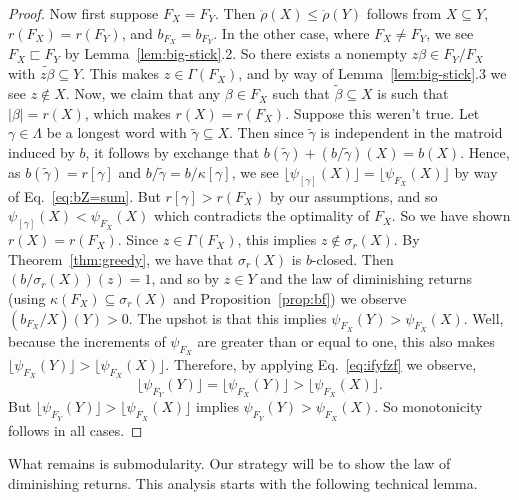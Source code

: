 \documentclass[11pt]{article}
\newcommand{\glang}{\Lambda}
\newcommand{\greedyrep}{\ddot{\rho}}
\begin{document}
\begin{proof}
    Now first suppose $F_X = F_Y$.
    Then $\greedyrep(X) \leq \greedyrep(Y)$ follows from $X\subseteq Y$, $r(F_X) = r(F_Y)$, and $b_{F_X} = b_{F_Y}$.
    In the other case, where $F_X \neq F_Y$, we see $F_X \sqsubset F_Y$ by Lemma~\ref{lem:big-stick}.2.
    So there exists a nonempty $z\beta \in F_Y/F_X$ with $\widetilde{z\beta}\subseteq Y$.
    This makes $z \in \Gamma(F_X)$,
    and by way of Lemma~\ref{lem:big-stick}.3 we see $z \notin X$.
    Now, we claim that any $\beta \in F_X$ such that $\widetilde{\beta}\subseteq X$ is such that $|\beta| = r(X)$, which makes $r(X) = r(F_X)$.
    Suppose this weren't true.
    Let $\gamma\in\glang$ be a longest word with $\widetilde{\gamma}\subseteq X$.
    Then since $\widetilde{\gamma}$ is independent in the matroid induced by $b$, it follows by exchange that $b(\widetilde{\gamma}) + (b/\widetilde{\gamma})(X) = b(X)$.
    Hence, as $b(\widetilde{\gamma}) = r[\gamma]$ and $b/\widetilde{\gamma} = b/\kappa[\gamma]$, we see $\lfloor \psi_{[\gamma]}(X)\rfloor = \lfloor\psi_{F_X}(X)\rfloor$ by way of Eq.~\ref{eq:bZ=sum}.
    But $r[\gamma] > r(F_X)$ by our assumptions, and so $\psi_{[\gamma]}(X) < \psi_{F_X}(X)$ which contradicts the optimality of $F_X$.
    So we have shown $r(X) = r(F_X)$.
    Since $z \in \Gamma(F_X)$, this implies $z \notin \sigma_r(X)$.
    By Theorem~\ref{thm:greedy}, we have that $\sigma_r(X)$ is $b$-closed.
    Then $(b/\sigma_{r}(X))(z) = 1$, and so by $z \in Y$ and the law of diminishing returns (using $\kappa(F_X)\subseteq \sigma_r(X)$ and Proposition~\ref{prop:bf}) we observe $(b_{F_X}/X)(Y) > 0$.
    The upshot is that this implies $\psi_{F_X}(Y) > \psi_{F_X}(X)$.
    Well, because the increments of $\psi_{F_X}$ are greater than or equal to one, this also makes $\lfloor\psi_{F_X}(Y)\rfloor > \lfloor\psi_{F_X}(X)\rfloor$.
    Therefore, by applying Eq.~\ref{eq:ifyfzf} we observe,
    \[
        \lfloor \psi_{F_Y}(Y)\rfloor = \lfloor\psi_{F_X}(Y)\rfloor > \lfloor\psi_{F_X}(X)\rfloor.
    \]
    But $\lfloor \psi_{F_Y}(Y)\rfloor > \lfloor\psi_{F_X}(X)\rfloor$ implies $\psi_{F_Y}(Y) > \psi_{F_X}(X)$.
    So monotonicity follows in all cases.
\end{proof}

What remains is submodularity.
Our strategy will be to show the law of diminishing returns.
This analysis starts with the following technical lemma.
\end{document}
